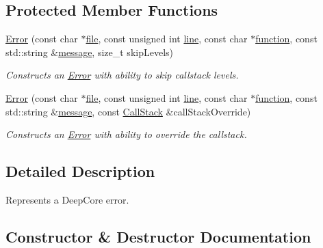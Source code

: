 \subsection*{Protected Member Functions}
\begin{DoxyCompactItemize}
\item 
\hyperlink{group___utility_module_ga50ae85ad2e348408fa2552abfb6570f9}{Error} (const char $\ast$\hyperlink{group___utility_module_ga0b75e32780cb8534179ff3c060739496}{file}, const unsigned int \hyperlink{group___utility_module_ga13437b5caffe754b7a32fc3c514907e5}{line}, const char $\ast$\hyperlink{group___utility_module_gaa69c98222c56544a9094154a8eab4db9}{function}, const std\+::string \&\hyperlink{group___utility_module_ga7269ba8049ed86338733955565242539}{message}, size\+\_\+t skip\+Levels)
\begin{DoxyCompactList}\small\item\em Constructs an \hyperlink{classdg_1_1deepcore_1_1_error}{Error} with ability to skip callstack levels. \end{DoxyCompactList}\item 
\hyperlink{group___utility_module_ga3d20a4e6ef5f0579707ccf7b01f235b2}{Error} (const char $\ast$\hyperlink{group___utility_module_ga0b75e32780cb8534179ff3c060739496}{file}, const unsigned int \hyperlink{group___utility_module_ga13437b5caffe754b7a32fc3c514907e5}{line}, const char $\ast$\hyperlink{group___utility_module_gaa69c98222c56544a9094154a8eab4db9}{function}, const std\+::string \&\hyperlink{group___utility_module_ga7269ba8049ed86338733955565242539}{message}, const \hyperlink{group___utility_module_gabdf2d70ae3aab3c57142eddec69a725c}{Call\+Stack} \&call\+Stack\+Override)
\begin{DoxyCompactList}\small\item\em Constructs an \hyperlink{classdg_1_1deepcore_1_1_error}{Error} with ability to override the callstack. \end{DoxyCompactList}\end{DoxyCompactItemize}


\subsection{Detailed Description}
Represents a Deep\+Core error. 

\subsection{Constructor \& Destructor Documentation}
